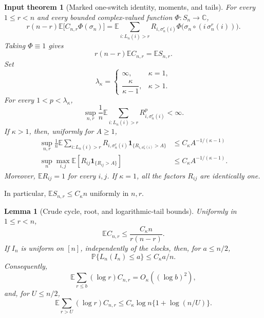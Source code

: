 \documentclass[11pt]{article}
\newtheorem{lemma}[theorem]{Lemma}
\newtheorem{inputtheorem}[theorem]{Input theorem}
\theoremstyle{remark}
\newcommand{\Pp}{\mathbb P}
\newcommand{\Ee}{\mathbb E}
\newcommand{\one}{\mathbf 1}
\begin{document}
\begin{inputtheorem}[Marked one-switch identity, moments, and tails]\label{input:one-switch}
For every $1\leq r<n$ and every bounded complex-valued function
$\Phi:S_n\to\mathbb C$,
\begin{equation}\label{eq:marked-one-switch}
 r(n-r)\Ee\bigl[C_{n,r}\Phi(\sigma_n)\bigr]
 =\Ee\sum_{i:L_n(i)>r}
 R_{i,\sigma_n^r(i)}
 \Phi\bigl(\sigma_n\circ(i\,\sigma_n^r(i))\bigr).
\end{equation}
Taking $\Phi\equiv1$ gives
\begin{equation}\label{eq:one-switch}
 r(n-r)\Ee C_{n,r}=\Ee S_{n,r}.
\end{equation}
Set
\[
 \lambda_\kappa=
 \begin{cases}
  \infty,&\kappa=1,\\[1mm]
  \dfrac{\kappa}{\kappa-1},&\kappa>1.
 \end{cases}
\]
For every $1<p<\lambda_\kappa$,
\begin{equation}\label{eq:selected-p}
 \sup_{n,r}\frac1n\Ee\sum_{i:L_n(i)>r}
 R_{i,\sigma_n^r(i)}^p<\infty.
\end{equation}
If $\kappa>1$, then, uniformly for $A\geq1$,
\begin{align}
 \sup_{n,r}\frac1n\Ee\sum_{i:L_n(i)>r}
 R_{i,\sigma_n^r(i)}\one_{\{R_{i,\sigma_n^r(i)}>A\}}
 &\leq C_\kappa A^{-1/(\kappa-1)}\label{eq:selected-tail}\\
 \sup_{n}\max_{i,j}\Ee\left[
 R_{ij}\one_{\{R_{ij}>A\}}\right]
 &\leq C_\kappa A^{-1/(\kappa-1)}.\label{eq:fresh-tail}
\end{align}
Moreover, $\Ee R_{ij}=1$ for every $i,j$.  If $\kappa=1$, all the factors
$R_{ij}$ are identically one.
\end{inputtheorem}

In particular, $\Ee S_{n,r}\leq C_\kappa n$ uniformly in $n,r$.

\begin{lemma}[Crude cycle, root, and logarithmic-tail bounds]
\label{lem:crude}
Uniformly in $1\leq r<n$,
\begin{equation}\label{eq:Cr-crude}
 \Ee C_{n,r}\leq \frac{C_\kappa n}{r(n-r)}.
\end{equation}
If $I_n$ is uniform on $[n]$, independently of the clocks, then, for
$a\leq n/2$,
\begin{equation}\label{eq:root-crude}
 \Pp\{L_n(I_n)\leq a\}\leq C_\kappa a/n.
\end{equation}
Consequently,
\begin{equation}\label{eq:log-cycle-tail}
 \Ee\sum_{r\leq b}(\log r)C_{n,r}=O_\kappa((\log b)^2),
\end{equation}
and, for $U\leq n/2$,
\begin{equation}\label{eq:large-log-tail}
 \Ee\sum_{r>U}(\log r)C_{n,r}
 \leq C_\kappa\log n\{1+\log(n/U)\}.
\end{equation}
\end{lemma}
\end{document}
